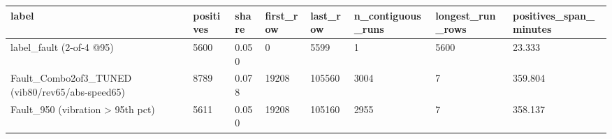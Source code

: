 \begin{tabular}{llllllll}
\toprule
label & positives & share & first\_row & last\_row & n\_contiguous\_runs & longest\_run\_rows & positives\_span\_minutes \\
\midrule
label\_fault (2-of-4 @95) & 5600 & 0.050 & 0 & 5599 & 1 & 5600 & 23.333 \\
Fault\_Combo2of3\_TUNED (vib80/rev65/abs-speed65) & 8789 & 0.078 & 19208 & 105560 & 3004 & 7 & 359.804 \\
Fault\_950 (vibration > 95th pct) & 5611 & 0.050 & 19208 & 105160 & 2955 & 7 & 358.137 \\
\bottomrule
\end{tabular}
